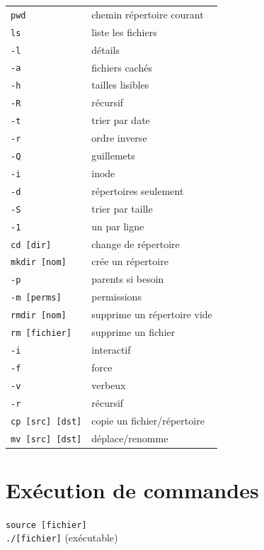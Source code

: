 \documentclass[10pt]{article}
\begin{document}
\begin{multicols}{4}
\begin{tabularx}{\columnwidth}{l|X}
  \lstinline|pwd| & chemin répertoire courant \\
  \lstinline|ls| & liste les fichiers \\
  \quad \lstinline|-l| & \quad détails \\
  \quad \lstinline|-a| & \quad fichiers cachés \\
  \quad \lstinline|-h| & \quad tailles lisibles \\
  \quad \lstinline|-R| & \quad récursif \\
  \quad \lstinline|-t| & \quad trier par date \\
  \quad \lstinline|-r| & \quad ordre inverse \\
  \quad \lstinline|-Q| & \quad guillemets \\
  \quad \lstinline|-i| & \quad inode \\
  \quad \lstinline|-d| & \quad répertoires seulement \\
  \quad \lstinline|-S| & \quad trier par taille \\
  \quad \lstinline|-1| & \quad un par ligne \\
  \lstinline|cd [dir]| & \quad change de répertoire \\
    \lstinline|mkdir [nom]| & \quad crée un répertoire \\
      \quad \lstinline|-p| & \quad parents si besoin \\
      \quad \lstinline|-m [perms]| & \quad permissions \\
  \lstinline|rmdir [nom]| & \quad supprime un répertoire vide \\
  \lstinline|rm [fichier]| & \quad supprime un fichier \\
    \quad \lstinline|-i| & \quad interactif \\
    \quad \lstinline|-f| & \quad force \\
    \quad \lstinline|-v| & \quad verbeux \\
    \quad \lstinline|-r| & \quad récursif \\
  \lstinline|cp [src] [dst]| & \quad copie un fichier/répertoire \\
  \lstinline|mv [src] [dst]| & \quad déplace/renomme \\
\end{tabularx}

\section*{Exécution de commandes}
\lstinline|source [fichier]| \\
\lstinline|./[fichier]| (exécutable) \\


\end{multicols}
\end{document}
